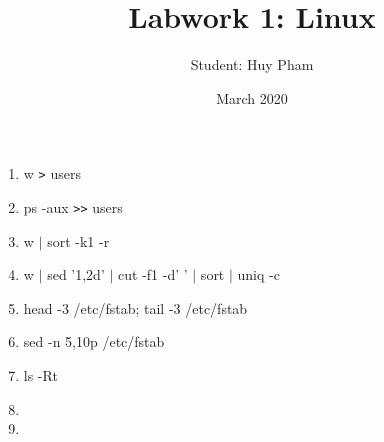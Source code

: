 \documentclass{article}
\title{Labwork 1: Linux}
\author{Student: Huy Pham }
\date{March 2020}
\begin{document}
\maketitle
    \begin{enumerate}
        \item w \verb|>| users
        \item ps -aux \verb|>>| users
        \item w $|$ sort -k1 -r
        \item w $|$ sed '1,2d' $|$ cut -f1 -d' ' $|$ sort $|$ uniq -c
        \item head -3 /etc/fstab; tail -3 /etc/fstab
        \item sed -n 5,10p /etc/fstab
        \item ls -Rt
        \item 
        \item 
    \end{enumerate}
\end{document}

